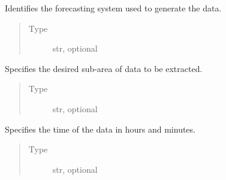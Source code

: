 \documentclass[letterpaper,10pt,english]{sphinxmanual}
\begin{document}
\begin{fulllineitems}
\begin{fulllineitems}
\end{fulllineitems}


\begin{fulllineitems}
\label{\detokenize{api:MarsRetrieval.MarsRetrieval.stream}}
Identifies the forecasting system used to generate the data.
\begin{quote}\begin{description}
\item[{Type}] \leavevmode
str, optional

\end{description}\end{quote}

\end{fulllineitems}


\begin{fulllineitems}
\label{\detokenize{api:MarsRetrieval.MarsRetrieval.area}}
Specifies the desired sub-area of data to be extracted.
\begin{quote}\begin{description}
\item[{Type}] \leavevmode
str, optional

\end{description}\end{quote}

\end{fulllineitems}


\begin{fulllineitems}
\label{\detokenize{api:MarsRetrieval.MarsRetrieval.time}}
Specifies the time of the data in hours and minutes.
\begin{quote}\begin{description}
\item[{Type}] \leavevmode
str, optional

\end{description}\end{quote}


\end{fulllineitems}
\end{fulllineitems}
\end{document}
